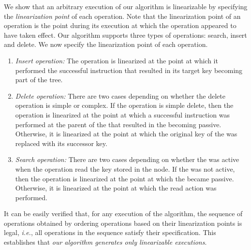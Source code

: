We show that an arbitrary execution of our algorithm is linearizable by specifying the \emph{linearization point} of each operation. Note that the linearization point of an operation is the point during its execution at which the operation appeared to have taken effect. Our algorithm supports three types of operations: search, insert and delete. 
We now specify the linearization point of each operation.
\begin{enumerate}[leftmargin=*, noitemsep]

\item \emph{Insert operation:} The operation is linearized at the point at which it performed the successful \CAS{} instruction that resulted in its target key becoming part of the tree.
		
					
\item \emph{Delete operation:} There are two cases depending on whether the delete operation is simple or complex. If the operation is simple delete, then the operation is linearized at the point at which a successful \CAS{} instruction was performed at the parent of the \targetnode{} that resulted in the \targetnode{} becoming passive. Otherwise, it is linearized at the point at which the original key of the \targetnode{} was replaced with its successor key.
   
 
   
\item \emph{Search operation:} There are two cases depending on whether the \targetnode{} was active when the operation read the key stored in the node. 
If the \targetnode{} was not active, then the operation is linearized at the point at which the \targetnode{} became passive. Otherwise, it is linearized at the 
point at which the read action was performed.
                       

\end{enumerate}


It can be easily verified that, for any execution of the algorithm, the sequence of operations
obtained by ordering operations based on their linearization points is legal, \emph{i.e.}, all operations in the sequence satisfy their 
specification. 
This establishes that \emph{our algorithm generates only linearizable executions}.

\begin{comment}
 
Thus we have:

\begin{theorem}
Every execution of our algorithm is linearizable.
\end{theorem}
	
\end{comment}
							 
